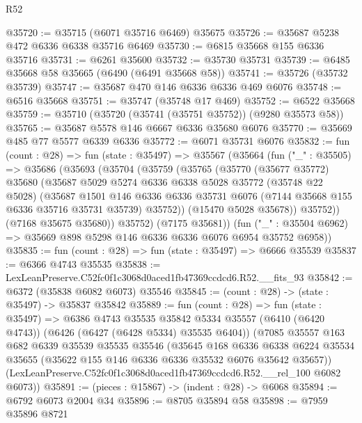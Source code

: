 \begin{lexlean}{R52}
\begin{coremodule}
@35720 := @35715 (@6071 @35716 @6469) @35675
@35726 := @35687 @5238 @472 @6336 @6338 @35716 @6469
@35730 := @6815 @35668 @155 @6336 @35716
@35731 := @6261 @35600
@35732 := @35730 @35731
@35739 := @6485 @35668 @58 @35665 (@6490 (@6491 @35668 @58))
@35741 := @35726 (@35732 @35739)
@35747 := @35687 @470 @146 @6336 @6336 @469 @6076
@35748 := @6516 @35668
@35751 := @35747 (@35748 @17 @469)
@35752 := @6522 @35668
@35759 := @35710 (@35720 (@35741 (@35751 @35752)) (@9280 @35573 @58))
@35765 := @35687 @5578 @146 @6667 @6336 @35680 @6076
@35770 := @35669 @485 @77 @5577 @6339 @6336
@35772 := @6071 @35731 @6076
@35832 := fun (count : @28) =>
  fun (state : @35497) =>
  @35567
    (@35664
      (fun ("_" : @35505) =>
      @35686
        (@35693
          (@35704
            (@35759
              (@35765
                (@35770
                  (@35677 @35772)
                  @35680
                  (@35687
                    @5029
                    @5274
                    @6336
                    @6338
                    @5028
                    @35772
                    (@35748 @22 @5028)
                    (@35687
                      @1501
                      @146
                      @6336
                      @6336
                      @35731
                      @6076
                      (@7144 @35668 @155 @6336 @35716 @35731 @35739)
                      @35752))
                  (@15470 @5028 @35678))
                @35752))
            (@7168 @35675 @35680))
          @35752)
        (@7175 @35681))
      (fun ("_" : @35504 @6962) => @35669 @898 @5298 @146 @6336 @6336 @6076 @6954 @35752 @6958))
@35835 := fun (count : @28) => fun (state : @35497) => @6666 @35539
@35837 := @6366 @4743 @35535
@35838 := LexLeanPreserve.C52fc0f1c3068d0aced1fb47369ccdcd6.R52.__fits_93
@35842 := @6372 (@35838 @6082 @6073) @35546
@35845 := (count : @28) -> (state : @35497) -> @35837 @35842
@35889 := fun (count : @28) =>
  fun (state : @35497) =>
  @6386
    @4743
    @35535
    @35842
    @5334
    @35557
    (@6410 (@6420 @4743))
    (@6426 (@6427 (@6428 @5334) @35535 @6404))
    (@7085
      @35557
      @163
      @682
      @6339
      @35539
      @35535
      @35546
      (@35645
        @168
        @6336
        @6338
        @6224
        @35534
        @35655
        (@35622 @155 @146 @6336 @6336 @35532 @6076 @35642 @35657))
      (LexLeanPreserve.C52fc0f1c3068d0aced1fb47369ccdcd6.R52.__rel_100 @6082 @6073))
@35891 := (pieces : @15867) -> (indent : @28) -> @6068
@35894 := @6792 @6073 @2004 @34
@35896 := @8705 @35894 @58
@35898 := @7959 @35896 @8721

\end{coremodule}
\end{lexlean}
